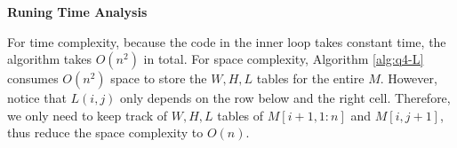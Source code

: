 \documentclass[12pt,article]{article}
\begin{document}
\newpage
\textbf{Runing Time Analysis}

For time complexity, because the code in the inner loop takes constant time, the algorithm takes $O(n^2)$ in total. For space complexity, Algorithm \ref{alg:q4-L} consumes $O(n^2)$ space to store the $W,H,L$ tables for the entire $M$. However, notice that $L(i,j)$ only depends on the row below and the right cell. Therefore, we only need to keep track of $W,H,L$ tables of $M[i+1,1:n]$ and $M[i,j+1]$, thus reduce the space complexity to $O(n)$.

\newpage


\end{document}
